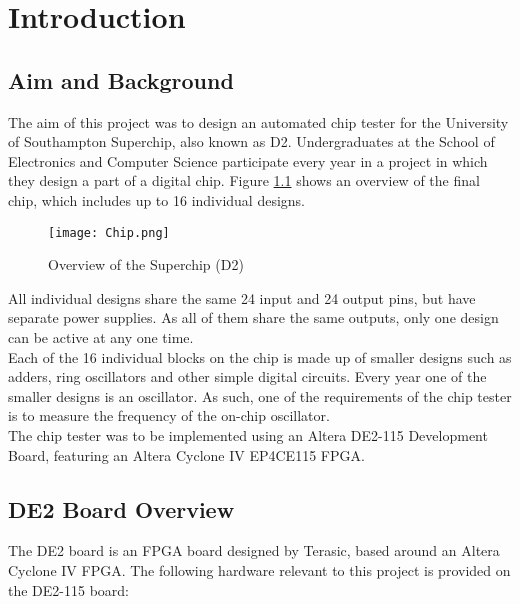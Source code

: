 \chapter{Introduction}

\section{Aim and Background}
The aim of this project was to design an automated chip tester for the University
of Southampton Superchip, also known as D2. Undergraduates at the School of Electronics
and Computer Science participate every year in a project in which they
design a part of a digital chip. Figure \ref{fig:chip_overview} shows an overview
of the final chip, which includes up to 16 individual designs.
\begin{figure}[h!]
\centering
\texttt{[image: Chip.png]}
\caption{Overview of the Superchip (D2)}
\label{fig:chip_overview}
\end{figure}

All individual designs share the same 24 input and 24 output pins, but have separate power supplies.
As all of them share the same outputs, only one design can be active at any one time.
\\

Each of the 16 individual blocks on the chip is made up of smaller designs such as
adders, ring oscillators and other simple digital circuits. Every year one of the
smaller designs is an oscillator. As such, one of the requirements of the chip tester
is to measure the frequency of the on-chip oscillator.
\\

The chip tester was to be implemented using an Altera DE2-115 Development Board,
featuring an Altera Cyclone IV EP4CE115 FPGA.


\newpage
\section{DE2 Board Overview}
The DE2 board is an FPGA board designed by Terasic, based around an Altera
Cyclone IV FPGA. The following hardware relevant to this project is provided on
the DE2-115 board:

